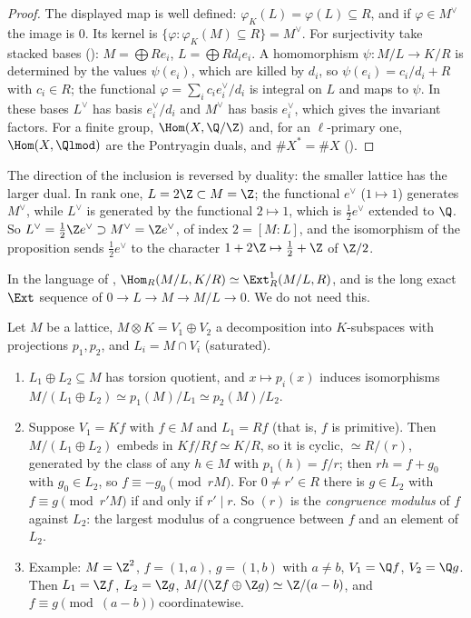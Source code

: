 \begin{proof}
The displayed map is well defined: $\varphi_K(L)=\varphi(L)\subseteq R$, and if $\varphi\in M^\vee$ the image is $0$. Its kernel is $\{\varphi:\varphi_K(M)\subseteq R\}=M^\vee$.
For surjectivity take stacked bases (): $M=\bigoplus Re_i$, $L=\bigoplus Rd_ie_i$. A homomorphism
$\psi\colon M/L\to K/R$ is determined by the values $\psi(e_i)$, which are killed by $d_i$, so $\psi(e_i)=c_i/d_i+R$ with $c_i\in R$; the functional
$\varphi=\sum_ic_ie_i^\vee/d_i$ is integral on $L$ and maps to $\psi$. In these bases $L^\vee$ has basis $e_i^\vee/d_i$ and $M^\vee$ has basis $e_i^\vee$, which gives
the invariant factors. For a finite group, $\Hom(X,\Q/\Z)$ and, for an $\ell$-primary one, $\Hom(X,\Qlmod)$ are the Pontryagin duals, and
$\#X^*=\#X$ ().
\end{proof}

The direction of the inclusion is reversed by duality: the smaller lattice has the larger dual. In rank one, $L=2\Z\subset M=\Z$; the functional
$e^\vee$ ($1\mapsto1$) generates $M^\vee$, while $L^\vee$ is generated by the functional $2\mapsto1$, which is $\tfrac12e^\vee$ extended to $\Q$. So
$L^\vee=\tfrac12\Z e^\vee\supset M^\vee=\Z e^\vee$, of index $2=[M:L]$, and the isomorphism of the proposition sends $\tfrac12e^\vee$ to the character
$1+2\Z\mapsto\tfrac12+\Z$ of $\Z/2$.

\begin{remark}\label{rem:modules:ext}
In the language of , $\Hom_R(M/L,K/R)\simeq\Ext^1_R(M/L,R)$, and  is the long exact
$\Ext$ sequence of $0\to L\to M\to M/L\to0$. We do not need this.
\end{remark}

\begin{proposition}\label{prop:modules:congruence-decomposition}
Let $M$ be a lattice, $M\otimes K=V_1\oplus V_2$ a decomposition into $K$-subspaces with projections $p_1,p_2$, and $L_i=M\cap V_i$ (saturated).
\begin{enumerate}[label=(\roman*)]
\item $L_1\oplus L_2\subseteq M$ has torsion quotient, and $x\mapsto p_i(x)$ induces isomorphisms $M/(L_1\oplus L_2)\simeq p_1(M)/L_1\simeq p_2(M)/L_2$.
\item Suppose $V_1=Kf$ with $f\in M$ and $L_1=Rf$ (that is, $f$ is primitive). Then $M/(L_1\oplus L_2)$ embeds in $Kf/Rf\simeq K/R$, so it is cyclic,
$\simeq R/(r)$, generated by the class of any $h\in M$ with $p_1(h)=f/r$; then $rh=f+g_0$ with $g_0\in L_2$, so $f\equiv-g_0\pmod{rM}$. For
$0\ne r'\in R$ there is $g\in L_2$ with $f\equiv g\pmod{r'M}$ if and only if $r'\mid r$. So $(r)$ is the \emph{congruence modulus} of $f$
against $L_2$: the largest modulus of a congruence between $f$ and an element of $L_2$.
\item Example: $M=\Z^2$, $f=(1,a)$, $g=(1,b)$ with $a\ne b$, $V_1=\Q f$, $V_2=\Q g$. Then $L_1=\Z f$, $L_2=\Z g$, $M/(\Z f\oplus\Z g)\simeq\Z/(a-b)$, and
$f\equiv g\pmod{(a-b)}$ coordinatewise.
\end{enumerate}
\end{proposition}

